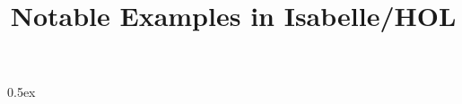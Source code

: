 \documentclass[11pt,a4paper]{article}
\begin{document}
\title{Notable Examples in Isabelle/HOL}
\maketitle

\tableofcontents

\parindent 0pt \parskip 0.5ex





\end{document}
